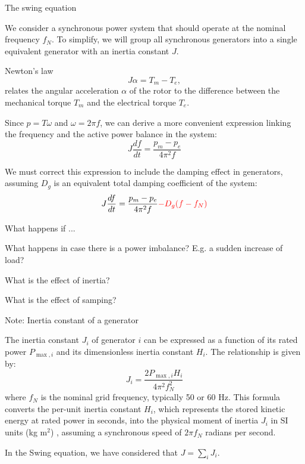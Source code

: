 \begin{frame}[allowframebreaks]{The swing equation}

    We consider a synchronous power system that should operate at the nominal frequency $f_N$.
    To simplify, we will group all synchronous generators into a single equivalent generator with an
    inertia constant $J$. %

    Newton's law $$J\alpha = T_m-T_e,$$ 
    relates the angular acceleration $\alpha$ of the rotor to the difference between the mechanical torque $T_m$ and the electrical torque $T_e$.
    
    Since $p = T\omega$ and $\omega = 2\pi f$, we can derive a more convenient expression linking the frequency and the active power balance in the system:
    $$J \frac{df}{dt} = \frac{p_m - p_e}{4\pi^2 f}$$

    We must correct this expression to include the damping effect in generators, assuming $D_g$ is an equivalent total damping coefficient of the system: 
    $$J \frac{df}{dt} = \frac{p_m - p_e}{4\pi^2 f} \color{red}{- D_g (f-f_N)}$$

\end{frame}
\begin{frame}{What happens if ...}

    \begin{block}{What happens in case there is a power imbalance?}
    E.g. a sudden increase of load? \vspace*{1cm}
    \end{block}
    
    \begin{block}{What is the effect of inertia?}
      \vspace*{1cm}
    \end{block}

    \begin{block}{What is the effect of samping?}
      \vspace*{1cm}
    \end{block}

\end{frame}

\begin{frame}{Note: Inertia constant of a generator}

  The inertia constant \( J_i \) of generator \( i \) can be expressed as a function of its rated power \( P_{\max,i} \) and its dimensionless inertia constant \( H_i \). The relationship is given by:
\[
J_i = \frac{2 P_{\max,i} H_i}{4 \pi^2 f_N^2}
\]
where \( f_N \) is the nominal grid frequency, typically 50 or 60 Hz. 
This formula converts the per-unit inertia constant \( H_i \), which represents the stored kinetic energy at rated power in seconds, into the physical moment of inertia \( J_i \) in SI units (kg m$^2$) , assuming a synchronous speed of \( 2\pi f_N \) radians per second.

In the Swing equation, we have considered that $J = \sum_i J_i$.

\end{frame}

